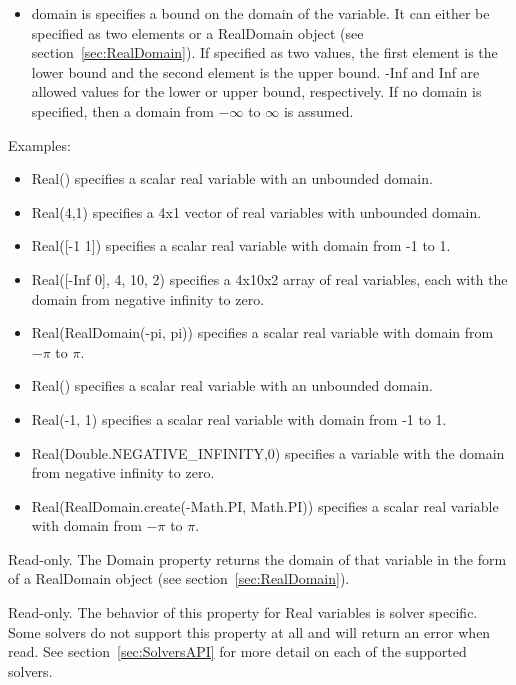 \ifjava
\begin{itemize}
\item domain is specifies a bound on the domain of the variable. It can either be specified as two elements or a RealDomain object (see section~\ref{sec:RealDomain}).  If specified as two values, the first element is the lower bound and the second element is the upper bound. -Inf and Inf are allowed values for the lower or upper bound, respectively.  If no domain is specified, then a domain from $-\infty$ to $\infty$ is assumed.
\end{itemize}
\fi

Examples:

\ifmatlab
\begin{itemize}
\item Real() specifies a scalar real variable with an unbounded domain.
\item Real(4,1) specifies a 4x1 vector of real variables with unbounded domain.
\item Real([-1 1]) specifies a scalar real variable with domain from -1 to 1.
\item Real([-Inf 0], 4, 10, 2) specifies a 4x10x2 array of real variables, each with the domain from negative infinity to zero.
\item Real(RealDomain(-pi, pi)) specifies a scalar real variable with domain from $-\pi$ to $\pi$.
\end{itemize}
\fi

\ifjava
\begin{itemize}
\item Real() specifies a scalar real variable with an unbounded domain.
\item Real(-1, 1) specifies a scalar real variable with domain from -1 to 1.
\item Real(Double.NEGATIVE\_INFINITY,0) specifies a variable with the domain from negative infinity to zero.
\item Real(RealDomain.create(-Math.PI, Math.PI)) specifies a scalar real variable with domain from $-\pi$ to $\pi$.
\end{itemize}
\fi




Read-only.  The Domain property returns the domain of that variable in the form of a RealDomain object (see section~\ref{sec:RealDomain}).


Read-only.  The behavior of this property for Real variables is solver specific.  Some solvers do not support this property at all and will return an error when read.  See section~\ref{sec:SolversAPI} for more detail on each of the supported solvers.


